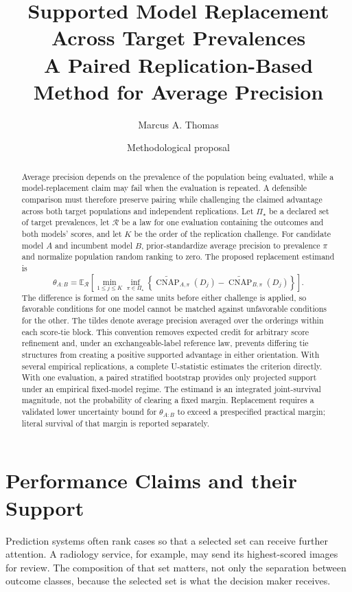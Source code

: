 \documentclass[11pt]{article}
\title{Supported Model Replacement Across Target Prevalences\\
\large A Paired Replication-Based Method for Average Precision}
\author{Marcus A. Thomas}
\date{Methodological proposal}
\newcommand{\CNAP}{\operatorname{CNAP}}
\newcommand{\Regime}{\mathcal{R}}
\newcommand{\PSet}{\Pi_\star}
\newcommand{\E}{\mathbb{E}}
\theoremstyle{remark}
\begin{document}
\maketitle

\begin{abstract}
Average precision depends on the prevalence of the population being evaluated, while a model-replacement claim may fail when the evaluation is repeated. A defensible comparison must therefore preserve pairing while challenging the claimed advantage across both target populations and independent replications. Let $\PSet$ be a declared set of target prevalences, let $\Regime$ be a law for one evaluation containing the outcomes and both models' scores, and let $K$ be the order of the replication challenge. For candidate model $A$ and incumbent model $B$, prior-standardize average precision to prevalence $\pi$ and normalize population random ranking to zero. The proposed replacement estimand is
\[
\theta_{A:B}
=
\E_{\Regime}\left[
\min_{1\leq j\leq K}
\inf_{\pi\in\PSet}
\left\{
\widetilde{\CNAP}_{A,\pi}(D_j)
-
\widetilde{\CNAP}_{B,\pi}(D_j)
\right\}
\right].
\]
The difference is formed on the same units before either challenge is applied, so favorable conditions for one model cannot be matched against unfavorable conditions for the other. The tildes denote average precision averaged over the orderings within each score-tie block. This convention removes expected credit for arbitrary score refinement and, under an exchangeable-label reference law, prevents differing tie structures from creating a positive supported advantage in either orientation. With several empirical replications, a complete U-statistic estimates the criterion directly. With one evaluation, a paired stratified bootstrap provides only projected support under an empirical fixed-model regime. The estimand is an integrated joint-survival magnitude, not the probability of clearing a fixed margin. Replacement requires a validated lower uncertainty bound for $\theta_{A:B}$ to exceed a prespecified practical margin; literal survival of that margin is reported separately.
\end{abstract}


\section{Performance Claims and their Support}
\label{sec:introduction}

Prediction systems often rank cases so that a selected set can receive further
attention. A radiology service, for example, may send its highest-scored images
for review. The composition of that set matters, not only the separation
between outcome classes, because the selected set is what the decision maker
receives.
\end{document}
